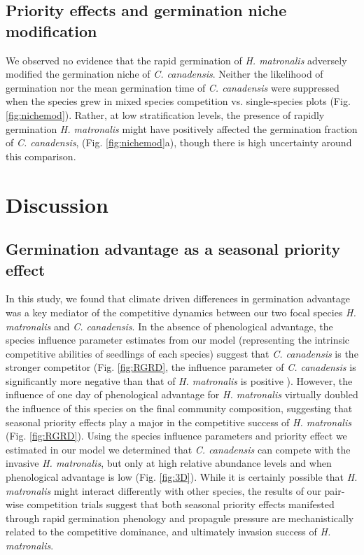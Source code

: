 \documentclass{article}[11pt]
\begin{document}
\subsection*{Priority effects and germination niche modification}
We observed no evidence that the rapid germination of \textit{H. matronalis} adversely modified the germination niche of \textit{C. canadensis}. Neither the likelihood of germination nor the mean germination time of \textit{C. canadensis} were suppressed when the species grew in mixed species competition vs. single-species plots (Fig. \ref{fig:nichemod}). Rather, at low stratification levels, the presence of rapidly germination \textit{H. matronalis} might have positively affected the germination fraction of \textit{C. canadensis}, (Fig. \ref{fig:nichemod}a), though there is high uncertainty around this comparison.

\section*{Discussion}

\subsection*{Germination advantage as a seasonal priority effect} 
In this study, we found that climate driven differences in germination advantage was a key mediator of the competitive dynamics between our two focal species \textit{H. matronalis} and \textit{C. canadensis}. In the absence of phenological advantage, the species influence parameter estimates from our model (representing the intrinsic competitive abilities of seedlings of each species) suggest that \textit{C. canadensis} is the stronger competitor (Fig. \ref{fig:RGRD}, the influence parameter of \textit{C. canadensis} is significantly more negative than that of \textit{H. matronalis} is positive ). However, the influence of one day of phenological advantage for \textit{H. matronalis} virtually doubled the influence of this species on the final community composition, suggesting that seasonal priority effects play a major in the competitive success of \textit{H. matronalis} (Fig. \ref{fig:RGRD}). Using the species influence parameters and priority effect we estimated in our model we determined that \textit{C. canadensis} can compete with the invasive \textit{H. matronalis}, but only at high relative abundance levels and when phenological advantage is low (Fig. \ref{fig:3D}). While it is certainly possible that \textit{H. matronalis} might interact differently with other species, the results of our pair-wise competition trials suggest that both seasonal priority effects manifested through rapid germination phenology and propagule pressure are mechanistically related to the competitive dominance, and ultimately invasion success of \textit{H. matronalis}.
\end{document}
